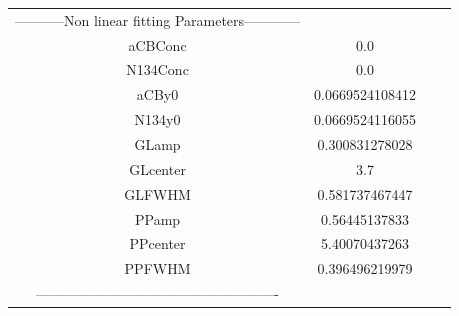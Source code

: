 \documentclass{article}
\begin{document}
\begin{tabular}{c c c c}

-----------Non linear fitting Parameters------------\\
aCBConc    &0.0\\
N134Conc   &0.0\\
aCBy0      &0.0669524108412\\
N134y0     &0.0669524116055\\
GLamp      &0.300831278028\\
GLcenter   &3.7\\
GLFWHM     &0.581737467447\\
PPamp      &0.56445137833\\
PPcenter   &5.40070437263\\
PPFWHM     &0.396496219979\\
----------------------------------------------------\\


\end{tabular}
\end{document}
